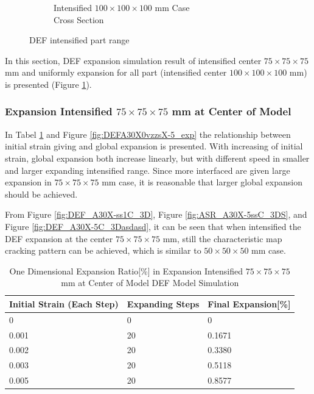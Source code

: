 \begin{figure}[!ht]
\begin{subfigure}{.33\textwidth}
      \caption{Intensified $100 \times 100 \times 100$ mm Case\\ Cross Section}
    \end{subfigure}
  \caption{DEF intensified part range}
  \label{fig:DEF_Xdddd}
\end{figure}

In this section, DEF expansion simulation result of intensified center $75 \times 75 \times 75$ mm and uniformly expansion for all part (intensified center $100 \times 100 \times 100$ mm) is presented (Figure \ref{fig:DEF_Xdddd}).

\subsubsection{Expansion Intensified $75 \times 75 \times 75$ mm at Center of Model}

In Tabel \ref{table:DEF_Xaa-5_EXP} and Figure \ref{fig:DEFA30X0vzzsX-5_exp} the relationship between initial strain giving and global expansion is presented. With increasing of initial strain, global expansion both increase linearly, but with different speed in smaller and larger expanding intensified range. Since more interfaced are given large expansion in $75 \times 75 \times 75$ mm case, it is reasonable that larger global expansion should be achieved.

From Figure \ref{fig:DEF_A30X-ss1C_3D}, Figure \ref{fig:ASR_A30X-5ssC_3DS}, and Figure \ref{fig:DEF_A30X-5C_3Dasdasd}, it can be seen that when intensified the DEF expansion at the center $75 \times 75 \times 75$ mm, still the characteristic map cracking pattern can be achieved, which is similar to $50 \times 50 \times 50$ mm case.

\begin{table}[ht!]
  \caption{One Dimensional Expansion Ratio[\%] in Expansion Intensified $75 \times 75 \times 75$ mm at Center of Model DEF Model Simulation}
\centering
\begin{tabular}{ ||p{2cm}|p{2cm}|p{2cm}| }
 \hline
    Initial Strain (Each Step) & Expanding Steps &  Final Expansion[\%] \\ [0.5ex]
 \hline\hline
  0 & 0 & 0  \\
  0.001 & 20 & 0.1671 \\
  0.002 & 20 & 0.3380 \\
  0.003 & 20 & 0.5118 \\
  0.005 & 20 & 0.8577 \\
 \hline
\end{tabular}

\label{table:DEF_Xaa-5_EXP}
\end{table}

